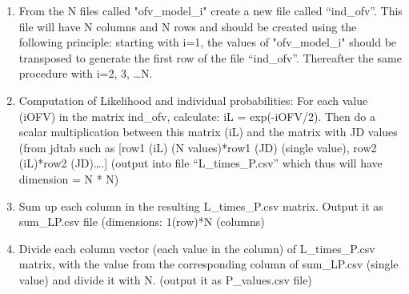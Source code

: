 \begin{enumerate}
\begin{enumerate}
	\end{enumerate}
\item From the N files called "ofv\_model\_i" create a new file called “ind\_ofv”. This file will have N columns and N rows and should be created using the following principle: starting with i=1, the values of "ofv\_model\_i" should be transposed to generate the first row of the file “ind\_ofv”. Thereafter the same procedure with i=2, 3, …N. 
\item Computation of Likelihood and individual probabilities: For each value (iOFV) in the matrix ind\_ofv, calculate:  iL = exp(-iOFV/2). Then do a scalar multiplication between this matrix (iL) and the matrix with JD values (from jdtab such as 
	[row1 (iL) (N values)*row1 (JD) (single value), row2 (iL)*row2 (JD)….] 
	(output into file “L\_times\_P.csv” which thus will have dimension = N * N)
\item Sum up each column in the resulting L\_times\_P.csv matrix. Output it as sum\_LP.csv file (dimensions: 1(row)*N (columns)
\item Divide each column vector (each value in the column)  of L\_times\_P.csv matrix, with the value from the corresponding column of sum\_LP.csv (single value) and divide it with N. (output it as P\_values.csv file)
\end{enumerate}



